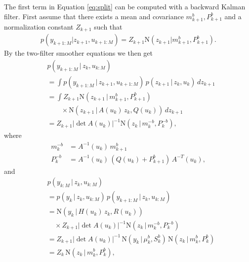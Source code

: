 \documentclass[twocolumn]{autart}    %
\begin{document}
%
The first term in Equation \eqref{eq:split} can be computed with a
backward Kalman filter. First assume
that there exists a mean and covariance $m^{b}_{k+1},P^{b}_{k+1}$ and a
normalization constant $Z_{k+1}$ such that
%
\begin{equation}
\begin{split}
  p(y_{k+1:M} | z_{k+1},u_{k+1:M})
  = Z_{k+1} \mathrm{N}(z_{k+1} | m^{b}_{k+1}, P^{b}_{k+1}).
\end{split}
\label{eq:normconst}
\end{equation}
%
By the two-filter smoother equations we then get
%
\begin{equation}
\begin{split}
  &p(y_{k+1:M} \,|\, z_{k},u_{k:M}) \\
  &=
  \int 
  p(y_{k+1:M} \,|\, z_{k+1},u_{k+1:M}) \,
  p(z_{k+1} \,|\, z_{k},u_{k}) \, dz_{k+1} \\
  &= \int 
  Z_{k+1} \mathrm{N}(z_{k+1} \,|\, m^{b}_{k+1}, P^{b}_{k+1}) \\
  &\qquad \times \mathrm{N}(z_{k+1} \,|\,A(u_k) \, z_k, Q(u_k)) \, dz_{k+1} \\
  &= 
  Z_{k+1} |\det A(u_k)|^{-1}
  \mathrm{N}(z_{k} \,|\, m^{-b}_{k}, P^{-b}_{k}),
\end{split}
\end{equation}
%
where
%
\begin{equation}
\begin{split}
   m^{-b}_k &= A^{-1}(u_k) \, m^b_{k+1} \\
   P^{-b}_k &= A^{-1}(u_k) \, (Q(u_k) + P^b_{k+1}) \, A^{-T}(u_k),
\end{split}
\label{eq:bkf_predict}
\end{equation}
%
and
%
\begin{equation}
\begin{split}
  &p(y_{k:M} \,|\, z_{k},u_{k:M}) \\
  &= p(y_{k} \,|\, z_{k},u_{k:M}) \, p(y_{k+1:M} \,|\, z_{k},u_{k:M}) \\
  &= \mathrm{N}(y_{k} \,|\, H(u_k) \, z_k, R(u_k)) \\
  &\quad \times Z_{k+1} |\det A(u_k)|^{-1}
  \mathrm{N}(z_{k} \,|\, m^{-b}_{k}, P^{-b}_{k}) \\
  &= Z_{k+1} |\det A(u_k)|^{-1} \, \mathrm{N}(y_{k} \,|\, \mu^b_k, S^b_k) \, 
     \mathrm{N}(z_{k} \,|\, m^{b}_{k}, P^{b}_{k}) \\
  &= Z_{k} \, 
     \mathrm{N}(z_{k} \,|\, m^{b}_{k}, P^{b}_{k}),
\end{split}
\end{equation}
\end{document}
